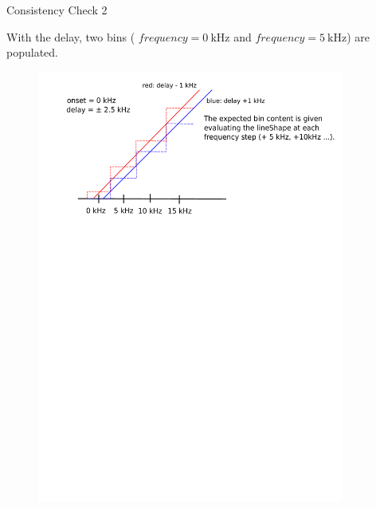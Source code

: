 \documentclass[9pt]{beamer}
\begin{document}
\begin{frame}{Consistency Check 2}

With the delay, two bins ( $frequency = \SI{0}{\kilo \hertz}$ and $frequency = \SI{5}{\kilo \hertz}$) are populated.  
\begin{figure}
\includegraphics[width = 0.9\textwidth]{ExplainingAlgorithm2.pdf}
\end{figure}
\end{frame}
\end{document}
